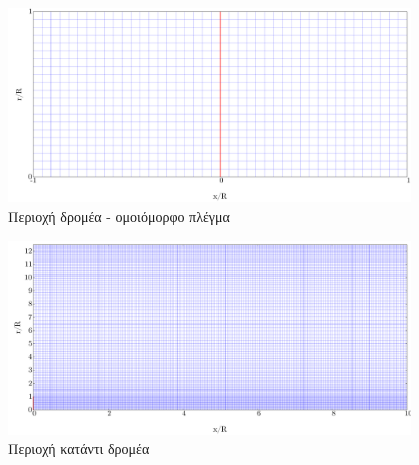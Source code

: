 \begin{figure}[h!]
    \begin{center}
        \includegraphics[width=0.95\textwidth]{figures/meshRotor.pdf}
    \end{center}
    \caption{Περιοχή δρομέα - ομοιόμορφο πλέγμα}
    \label{fig:meshRotor}
\end{figure}

\begin{figure}[h!]
    \begin{center}
        \includegraphics[width=0.95\textwidth]{figures/meshDown.pdf}
    \end{center}
    \caption{Περιοχή κατάντι δρομέα}
    \label{fig:meshDown}
\end{figure}
